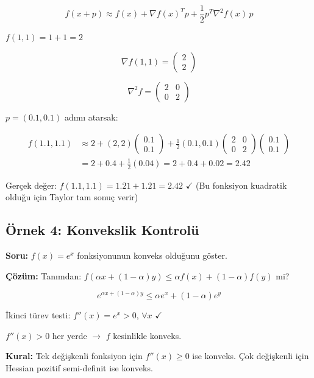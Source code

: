 \documentclass[12pt,a4paper]{article}
\theoremstyle{definition}
\theoremstyle{remark}
\begin{document}
\[
f(x+p) \approx f(x) + \nabla f(x)^T p + \frac{1}{2} p^T \nabla^2 f(x)\, p
\]

$f(1, 1) = 1 + 1 = 2$

\[
\nabla f(1, 1) = \begin{pmatrix} 2 \\ 2 \end{pmatrix}
\]

\[
\nabla^2 f = \begin{pmatrix} 2 & 0 \\ 0 & 2 \end{pmatrix}
\]

$p = (0.1, 0.1)$ ad{\i}m{\i} atarsak:

\begin{align*}
f(1.1, 1.1) &\approx 2 + (2, 2) \begin{pmatrix} 0.1 \\ 0.1 \end{pmatrix} + \frac{1}{2} (0.1, 0.1) \begin{pmatrix} 2 & 0 \\ 0 & 2 \end{pmatrix} \begin{pmatrix} 0.1 \\ 0.1 \end{pmatrix} \\
&= 2 + 0.4 + \frac{1}{2}(0.04) = 2 + 0.4 + 0.02 = 2.42
\end{align*}

Ger\c{c}ek de\u{g}er: $f(1.1, 1.1) = 1.21 + 1.21 = 2.42$ $\checkmark$ (Bu fonksiyon kuadratik oldu\u{g}u i\c{c}in Taylor tam sonu\c{c} verir)

\subsection{\"Ornek 4: Konvekslik Kontrol\"u}

\textbf{Soru:} $f(x) = e^x$ fonksiyonunun konveks oldu\u{g}unu g\"oster.

\textbf{\c{C}\"oz\"um:} Tan{\i}mdan: $f(\alpha x + (1-\alpha)y) \leq \alpha f(x) + (1-\alpha)f(y)$ mi?

\[
e^{\alpha x + (1-\alpha)y} \leq \alpha e^x + (1-\alpha) e^y
\]

\.{I}kinci t\"urev testi: $f''(x) = e^x > 0$, $\forall x$ $\checkmark$

$f''(x) > 0$ her yerde $\to$ $f$ kesinlikle konveks.

\textbf{Kural:} Tek de\u{g}i\c{s}kenli fonksiyon i\c{c}in $f''(x) \geq 0$ ise konveks. \c{C}ok de\u{g}i\c{s}kenli i\c{c}in Hessian pozitif semi-definit ise konveks.
\end{document}
